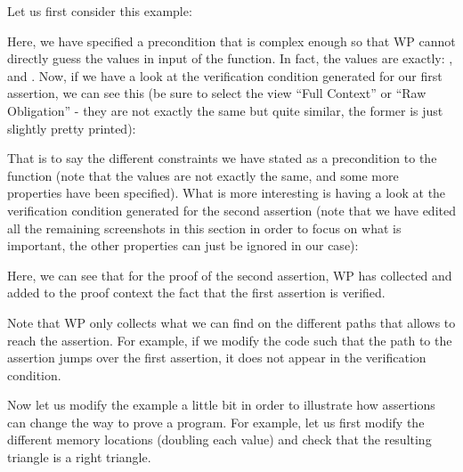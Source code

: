 Let us first consider this example:






Here, we have specified a precondition that is complex enough so that WP cannot
directly guess the values in input of the function. In fact, the values are
exactly: ,  and .
Now, if we have a look at the verification condition generated for our first
assertion, we can see this (be sure to select the view ``Full Context'' or
``Raw Obligation'' - they are not exactly the same but quite similar, the former
is just slightly pretty printed):




That is to say the different constraints we have stated as a precondition to the
function (note that the values are not exactly the same, and some more properties
have been specified). What is more interesting is having a look
at the verification condition generated for the second assertion (note that we
have edited all the remaining screenshots in this section in order to focus on
what is important, the other properties can just be ignored in our case):




Here, we can see that for the proof of the second assertion, WP has collected
and added to the proof context the fact that the first assertion is verified.


Note that WP only collects what we can find on the different paths that allows
to reach the assertion. For example, if we modify the code such that the path
to the assertion jumps over the first assertion, it does not appear in the
verification condition.







Now let us modify the example a little bit in order to illustrate how assertions
can change the way to prove a program. For example, let us first modify the
different memory locations (doubling each value) and check that the resulting
triangle is a right triangle.








